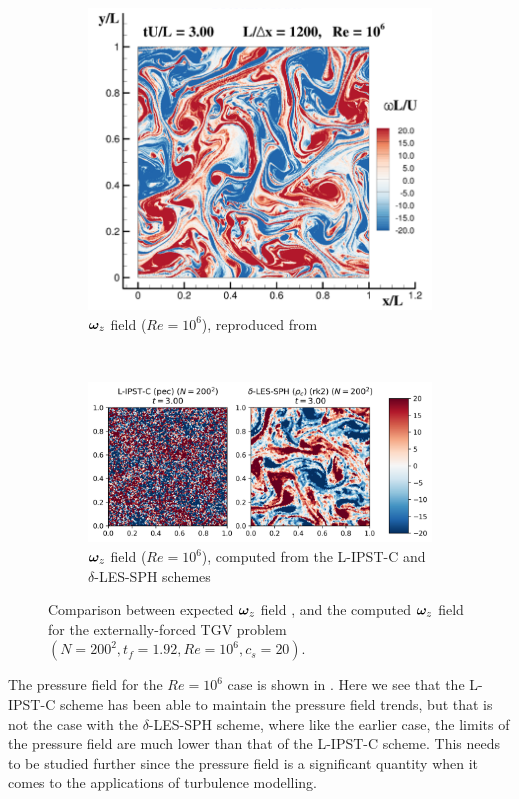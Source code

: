 \begin{figure}[htbp!]
\centering
\begin{subfigure}{10cm}
\centering\includegraphics[width=10cm]{Code-Figures/ext-force-tgv/colag_omegaz_t_3.png}
\caption{$\bm{\omega}_z$ field ($Re = 10^6$), reproduced from \cite{Antuono_Marrone_Di_Mascio_Colagrossi_2021}}
\end{subfigure}
\\ \vspace{1cm}
\begin{subfigure}{14cm}
\centering\includegraphics[width=14cm]{Code-Figures/ext-force-tgv/omegaz_t_3.png}
\caption{$\bm{\omega}_z$ field ($Re = 10^6$), computed from the L-IPST-C and $\delta$-LES-SPH schemes}
\end{subfigure}
\caption{Comparison between expected $\bm{\omega}_z$ field \parencite{Antuono_Marrone_Di_Mascio_Colagrossi_2021}, and the computed $\bm{\omega}_z$ field for the externally-forced TGV problem $(N=200^2, t_f=1.92, Re=10^6, c_s=20)$.}
\label{fig:tgv-forced-colag-omega}
\end{figure}


The pressure field for the $Re=10^6$ case is shown in .
Here we see that the L-IPST-C scheme has been able to maintain the pressure field trends, but that is not the case with the $\delta$-LES-SPH scheme, where like the earlier case, the limits of the pressure field are much lower than that of the L-IPST-C scheme.
This needs to be studied further since the pressure field is a significant quantity when it comes to the applications of turbulence modelling.


